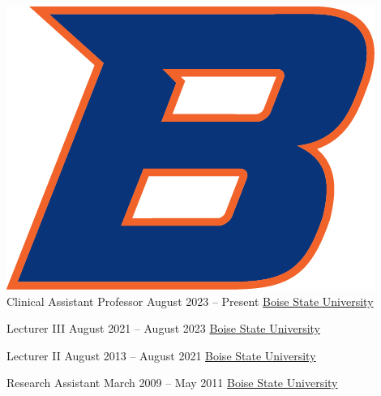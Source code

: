 \documentclass{shanep}
\begin{document}
\begin{itemize}
  \ressubheading
      {\includegraphics[scale=.3]{bsu.jpg}}
      {Clinical Assistant Professor}
      {August 2023 -- Present}
      {{\href{https://boisestate.edu}{Boise State University}}}
      {}

  \ressubheading
      {}
      {Lecturer III}
      {August 2021 -- August 2023}
      {{\href{https://boisestate.edu}{Boise State University}}}
      {}

  \ressubheading
      {}
      {Lecturer II}
      {August 2013 -- August 2021}
      {{\href{https://boisestate.edu}{Boise State University}}}
      {}

  \ressubheading
      {}
      {Research Assistant}
      {March 2009 -- May 2011}
      {{\href{https://boisestate.edu}{Boise State University}}}
      {}

\end{itemize}
\end{document}
